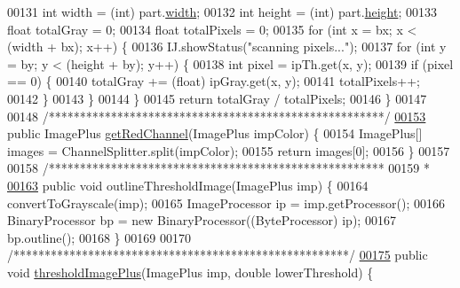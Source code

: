 \begin{DoxyCode}
00131     \textcolor{keywordtype}{int} width = (int) part.\hyperlink{classdata_1_1_spermatozoon_ae426f00e82704fa09578f5446e22d915}{width};
00132     \textcolor{keywordtype}{int} height = (\textcolor{keywordtype}{int}) part.\hyperlink{classdata_1_1_spermatozoon_a48083b65ac9a863566dc3e3fff09a5b4}{height};
00133     \textcolor{keywordtype}{float} totalGray = 0;
00134     \textcolor{keywordtype}{float} totalPixels = 0;
00135     \textcolor{keywordflow}{for} (\textcolor{keywordtype}{int} x = bx; x < (width + bx); x++) \{
00136       IJ.showStatus(\textcolor{stringliteral}{"scanning pixels..."});
00137       \textcolor{keywordflow}{for} (\textcolor{keywordtype}{int} y = by; y < (height + by); y++) \{
00138         \textcolor{keywordtype}{int} pixel = ipTh.get(x, y);
00139         \textcolor{keywordflow}{if} (pixel == 0) \{
00140           totalGray += (float) ipGray.get(x, y);
00141           totalPixels++;
00142         \}
00143       \}
00144     \}
00145     \textcolor{keywordflow}{return} totalGray / totalPixels;
00146   \}
00147 
00148   \textcolor{comment}{/******************************************************/}
\hypertarget{_computer_vision_8java_source_l00153}{}\hyperlink{classfunctions_1_1_computer_vision_a0a2c9c7e45231d1d09b3c8aca3df6511}{00153}   \textcolor{keyword}{public} ImagePlus \hyperlink{classfunctions_1_1_computer_vision_a0a2c9c7e45231d1d09b3c8aca3df6511}{getRedChannel}(ImagePlus impColor) \{
00154     ImagePlus[] images = ChannelSplitter.split(impColor);
00155     \textcolor{keywordflow}{return} images[0];
00156   \}
00157 
00158   \textcolor{comment}{/******************************************************}
00159 \textcolor{comment}{   * }
\hypertarget{_computer_vision_8java_source_l00163}{}\hyperlink{classfunctions_1_1_computer_vision_a1272b47ed42c25a4d2d7f7d891d0e42f}{00163} \textcolor{comment}{  public void outlineThresholdImage(ImagePlus imp) \{}
00164 \textcolor{comment}{    convertToGrayscale(imp);}
00165 \textcolor{comment}{    ImageProcessor ip = imp.getProcessor();}
00166 \textcolor{comment}{    BinaryProcessor bp = new BinaryProcessor((ByteProcessor) ip);}
00167 \textcolor{comment}{    bp.outline();}
00168 \textcolor{comment}{  \}}
00169 \textcolor{comment}{}
00170 \textcolor{comment}{  /******************************************************/}
\hypertarget{_computer_vision_8java_source_l00175}{}\hyperlink{classfunctions_1_1_computer_vision_a75c4bdce2977d9dcfe309e60b16cbf4f}{00175}   \textcolor{keyword}{public} \textcolor{keywordtype}{void} \hyperlink{classfunctions_1_1_computer_vision_a75c4bdce2977d9dcfe309e60b16cbf4f}{thresholdImagePlus}(ImagePlus imp, \textcolor{keywordtype}{double} lowerThreshold) \{

\end{DoxyCode}
